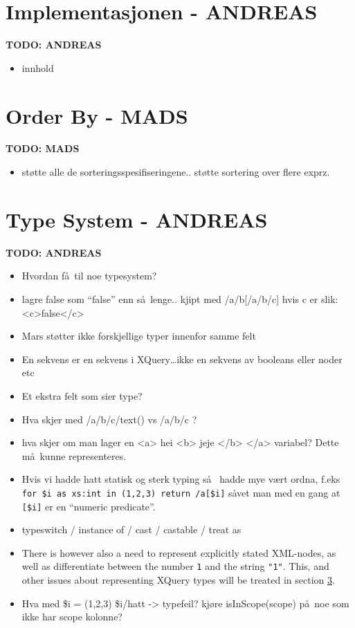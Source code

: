 



\section{Implementasjonen - {ANDREAS}}
\label{sect:disc:contextSens}
\textbf{\LARGE TODO: {ANDREAS}}
\begin{itemize}
  \item innhold
  
\end{itemize}


\section{Order By - {MADS}}
\label{sect:disc:orderby}
\textbf{\LARGE TODO: {MADS}}
\begin{itemize}
  \item st\o tte alle de sorteringsspesifiseringene.. st\o tte sortering over flere exprz.
\end{itemize}

\section{Type System - {ANDREAS}}
\label{sect:disc:typeSystem}
\textbf{\LARGE TODO: {ANDREAS}}
\begin{itemize}
  \item Hvordan f\aa~til noe typesystem?
  \item lagre false som ``false'' enn s\aa~lenge.. kjipt med /a/b[/a/b/c] hvis c er slik: <c>false</c>
  \item Mars st\o tter ikke forskjellige typer innenfor samme felt
  \item En sekvens er en sekvens i XQuery\ldots ikke en sekvens av booleans
  eller noder etc
  \item Et ekstra felt som sier type?
  \item Hva skjer med /a/b/c/text() vs /a/b/c ?
  \item hva skjer om man lager en <a> hei <b> jeje </b> </a> variabel? Dette
  m\aa~kunne representeres.
  \item Hvis vi hadde hatt statisk og sterk typing s\aa~ hadde mye v\ae rt
  ordna, f.eks \verb!for $i as xs:int in (1,2,3) return /a[$i]! s\aa vet man
  med en gang at \verb![$i]! er en ``numeric predicate''.
  \item typeswitch / instance of / cast / castable / treat as
  \item There is however also a need to represent explicitly stated XML-nodes, as well
	as differentiate between the number \texttt{1} and the string \texttt{"1"}.
	This, and other issues about representing XQuery types will be treated in
	section \ref{sect:disc:typeSystem}.  
\item Hva med \$i = (1,2,3) \$i/hatt -> typefeil? kj\o re isInScope(scope) p\aa~noe som ikke har scope kolonne?
	\end{itemize}

